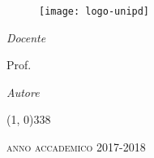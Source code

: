 \begin{titlepage}

\begin{center}

\begin{LARGE}
\textbf{\myUni}											%
\end{LARGE}

\vspace{10pt}											%

\begin{Large}
\textsc{\myDepartment}								%
\end{Large}

\vspace{10pt}											%

\begin{large}
\textsc{\myFaculty}										%
\end{large}

\vspace{30pt}											%

\begin{figure}[htbp]									%
\begin{center}											%
\texttt{[image: logo-unipd]}			%
\end{center}

\end{figure}

\vspace{30pt}											%

\begin{center}											%
\begin{LARGE}
\textbf{\myTitle}
\end{LARGE}
\end{center}

\begin{large}
\begin{flushleft}											%
\textit{Docente}

\vspace{5pt}
Prof. \myProf
\end{flushleft}

\begin{flushright}										%
\textit{Autore}

\vspace{5pt}
\myName
\end{flushright}
\end{large}

\vspace{40pt}

\line(1, 0){338}											%
\begin{normalsize}

\textsc{anno accademico 2017-2018}
\end{normalsize}

\end{center}
\end{titlepage}